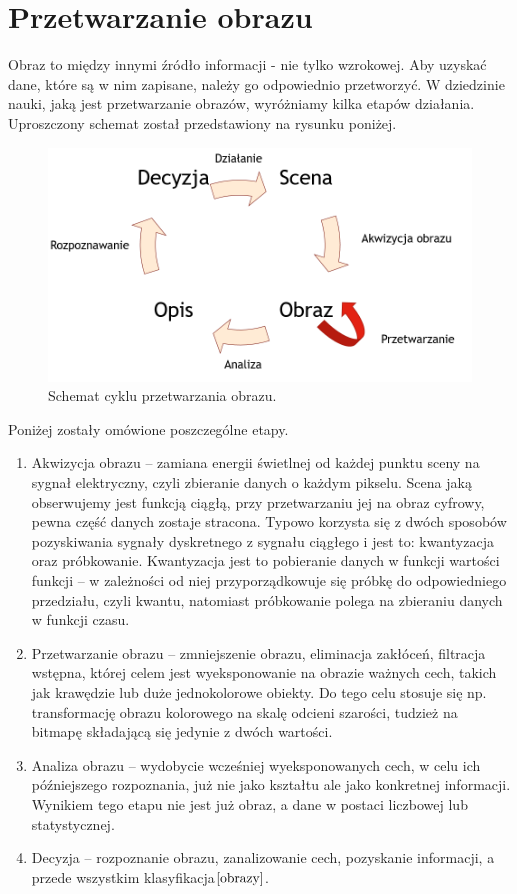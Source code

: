 \documentclass[eng,oneside]{mgr}
\begin{document}
\chapter{Przetwarzanie obrazu}
Obraz to między innymi źródło informacji - nie tylko wzrokowej. Aby uzyskać dane, które są w nim zapisane, należy go odpowiednio przetworzyć. W dziedzinie nauki, jaką jest przetwarzanie obrazów, wyróżniamy kilka etapów działania. Uproszczony schemat został przedstawiony na rysunku poniżej.
\begin{figure}[htbp]
\centering
\includegraphics[scale=0.5]{cyklprzetwarzania.png}
\caption{Schemat cyklu przetwarzania obrazu.}\par\medskip
\end{figure}
\hspace{1cm} Poniżej zostały omówione poszczególne etapy.
\begin{enumerate}
\item 	Akwizycja obrazu – zamiana energii świetlnej od każdej punktu sceny na sygnał elektryczny, czyli zbieranie danych o każdym pikselu. Scena jaką obserwujemy jest funkcją ciągłą, przy przetwarzaniu jej na obraz cyfrowy, pewna część danych zostaje stracona. Typowo korzysta się z dwóch sposobów pozyskiwania sygnały dyskretnego z sygnału ciągłego i jest to: kwantyzacja oraz próbkowanie. Kwantyzacja jest to pobieranie danych w funkcji wartości funkcji – w zależności od niej przyporządkowuje się próbkę do odpowiedniego przedziału, czyli kwantu, natomiast próbkowanie polega na zbieraniu danych w funkcji czasu.
\item 	Przetwarzanie obrazu – zmniejszenie obrazu, eliminacja zakłóceń, filtracja wstępna, której celem jest wyeksponowanie na obrazie ważnych cech, takich jak krawędzie lub duże jednokolorowe obiekty. Do tego celu stosuje się np. transformację obrazu kolorowego na skalę odcieni szarości, tudzież na bitmapę składającą się jedynie z dwóch wartości.
\item 	Analiza obrazu – wydobycie wcześniej wyeksponowanych cech, w celu ich późniejszego rozpoznania, już nie jako kształtu ale jako konkretnej informacji. Wynikiem tego etapu nie jest już obraz, a dane w postaci liczbowej lub statystycznej.
\item 	Decyzja – rozpoznanie obrazu, zanalizowanie cech, pozyskanie informacji, a przede wszystkim klasyfikacja$\cite{obrazy}$.
\end{enumerate}
\end{document}
